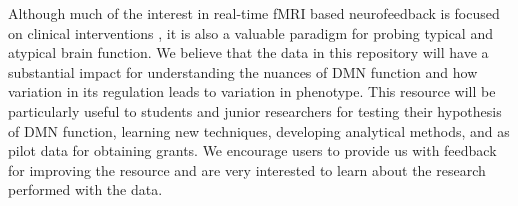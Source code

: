 Although much of the interest in real-time fMRI based neurofeedback is focused on clinical interventions \cite{Stoeckel2014}, it is also a valuable paradigm for probing typical and atypical brain function. We believe that the data in this repository will have a substantial impact for understanding the nuances of DMN function and how variation in its regulation leads to variation in phenotype. This resource will be particularly useful to students and junior researchers for testing their hypothesis of DMN function, learning new techniques, developing analytical methods, and as pilot data for obtaining grants. We encourage users to provide us with feedback for improving the resource and are very interested to learn about the research performed with the data.